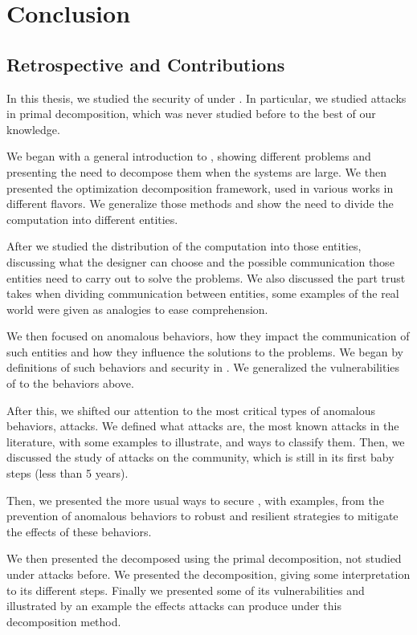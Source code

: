\documentclass[../main.tex]{subfiles}
\begin{document}
\chapter{Conclusion}\label{sec:conclusion}

\section{Retrospective and Contributions}
\label{sec:retr-contr}
In this thesis, we studied the security of \cps{} under \dmpc{}.
In particular, we studied attacks in primal decomposition, which was never studied before to the best of our knowledge.

We began with a general introduction to \mpc{}, showing different \mpc{} problems and presenting the need to decompose them when the systems are large.
We then presented the optimization decomposition framework, used in various works in different flavors.
We generalize those methods and show the need to divide the computation into different entities.

After we studied the distribution of the computation into those entities, discussing what the designer can choose and the possible communication those entities need to carry out to solve the problems.
We also discussed the part trust takes when dividing communication between entities, some examples of the real world were given as analogies to ease comprehension.

We then focused on anomalous behaviors, how they impact the communication of such entities and how they influence the solutions to the problems.
We began by definitions of such behaviors and security in \cps{}.
We generalized the vulnerabilities of \cps{} to the behaviors above.

After this, we shifted our attention to the most critical types of anomalous behaviors, attacks.
We defined what attacks are, the most known attacks in the literature, with some examples to illustrate, and ways to classify them.
Then, we discussed the study of attacks on the \dmpc{} community, which is still
in its first baby steps (less than 5 years).

Then, we presented the more usual ways to secure \cps{}, with examples, from the prevention of anomalous behaviors to robust and resilient strategies to mitigate the effects of these behaviors.

We then presented the \mpc{} decomposed using the primal decomposition, not studied under attacks before.
We presented the decomposition, giving some interpretation to its different steps.
Finally we presented some of its vulnerabilities and illustrated by an example the effects attacks can produce under this decomposition method.
\end{document}
